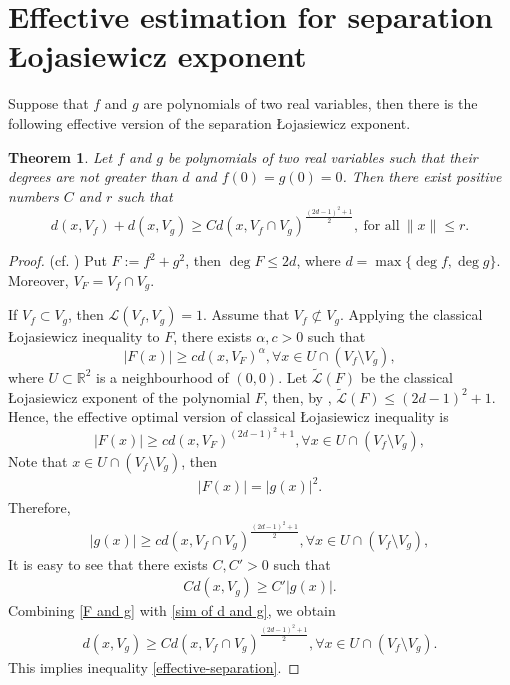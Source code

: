 \documentclass[reqno, 12pt ,a4letter]{amsart}
\newtheorem {theorem}{Theorem}[section]
\theoremstyle{definition}
\begin{document}
\section{Effective estimation for separation \L ojasiewicz exponent}\label{section4}
Suppose that $f$ and $g$ are polynomials of two real variables, then there is the following effective version of the separation \L ojasiewicz exponent.
\begin{theorem}
    Let $f$ and $g$ be polynomials of two real variables such that their degrees are not greater than $d$ and $f(0)=g(0)=0$. Then there exist positive numbers $C$ and $r$ such that 
    \begin{equation}\label{effective-separation}
	d(x, V_f) + d(x, V_g) \geq Cd(x, V_f \cap V_g)^{\frac{(2d-1)^2+1}{2}},\ \text{for all}\ \|x\| \leq r.
\end{equation}
\end{theorem}
\begin{proof}(cf. \cite{Kurdyka2014})
Put $F := f^2 + g^2$, then $\deg F \le 2d$, where $d = \max\{\deg f, \deg g\}$. Moreover, $V_F = V_f \cap V_g$. 

If $V_f \subset V_g$, then $\mathscr{L}(V_f, V_g) = 1$. Assume that $V_f \not\subset V_g$. Applying the classical \L ojasiewicz inequality to $F$, there exists $\alpha, c > 0$ such that
$$ |F(x)| \ge  c d(x, V_F)^\alpha, \forall x \in U \cap (V_f \setminus V_g),$$
where $U \subset \mathbb{R}^2$ is a neighbourhood of $(0,0)$. 
Let $\widetilde{\mathcal{L}}(F)$ be the classical \L ojasiewicz exponent of the polynomial $F$, then, by \cite[Theorem 4.4]{Nguyen2019}, $\widetilde{\mathcal{L}}(F) \le (2d-1)^2+1$. Hence, the effective optimal version of classical \L ojasiewicz inequality is 
$$ |F(x)| \ge  c d(x, V_F)^{(2d-1)^2+1}, \forall x \in U \cap (V_f \setminus V_g), $$
Note that $x \in U \cap (V_f \setminus V_g)$, then
\begin{align}\label{F and g}
|F(x)| = |g(x)|^2.    
\end{align}
Therefore,
\begin{align}
   |g(x)| \ge  c d(x, V_f \cap V_g)^{\frac{(2d-1)^2+1}{2}}, \forall x \in U \cap (V_f \setminus V_g),
\end{align}
It is easy to see that there exists $C, C' > 0$ such that
\begin{align}\label{sim of d and g}
   Cd(x, V_g) \ge C'|g(x)|. 
\end{align}
Combining \eqref{F and g} with \eqref{sim of d and g}, we obtain 
\begin{align*}
    d(x, V_g) \ge Cd(x, V_f \cap V_g)^{\frac{(2d-1)^2+1}{2}}, \forall x \in U \cap (V_f \setminus V_g).
\end{align*}
This implies inequality \eqref{effective-separation}.
\end{proof}
\end{document}
